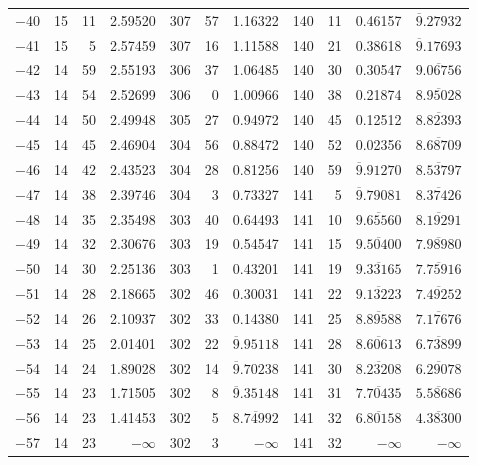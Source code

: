 \documentclass[12pt,a4paper]{article}
\begin{document}
\begin{small}
\begin{longtable}{@{}r|rr|rr|rr|rr|rr@{}}
$-$40 & 15 & 11 & 2.59520 & 307 & 57 & 1.16322 & 140 & 11 & 0.46157 & $\overline{9}.27932$ \\
$-$41 & 15 & 5 & 2.57459 & 307 & 16 & 1.11588 & 140 & 21 & 0.38618 & $\overline{9}.17693$ \\
$-$42 & 14 & 59 & 2.55193 & 306 & 37 & 1.06485 & 140 & 30 & 0.30547 & $\overline{9.06756}$ \\
$-$43 & 14 & 54 & 2.52699 & 306 & 0 & 1.00966 & 140 & 38 & 0.21874 & $\overline{8.95028}$ \\
$-$44 & 14 & 50 & 2.49948 & 305 & 27 & 0.94972 & 140 & 45 & 0.12512 & $\overline{8.82393}$ \\
$-$45 & 14 & 45 & 2.46904 & 304 & 56 & 0.88472 & 140 & 52 & 0.02356 & $\overline{8.68709}$ \\
$-$46 & 14 & 42 & 2.43523 & 304 & 28 & 0.81256 & 140 & 59 & $\overline{9}.91270$ & $\overline{8.53797}$ \\
$-$47 & 14 & 38 & 2.39746 & 304 & 3 & 0.73327 & 141 & 5 & $\overline{9}.79081$ & $\overline{8.37426}$ \\
$-$48 & 14 & 35 & 2.35498 & 303 & 40 & 0.64493 & 141 & 10 & $\overline{9.65560}$ & $\overline{8.19291}$ \\
$-$49 & 14 & 32 & 2.30676 & 303 & 19 & 0.54547 & 141 & 15 & $\overline{9.50400}$ & $\overline{7.98980}$ \\
$-$50 & 14 & 30 & 2.25136 & 303 & 1 & 0.43201 & 141 & 19 & $\overline{9.33165}$ & $\overline{7.75916}$ \\
$-$51 & 14 & 28 & 2.18665 & 302 & 46 & 0.30031 & 141 & 22 & $\overline{9.13223}$ & $\overline{7.49252}$ \\
$-$52 & 14 & 26 & 2.10937 & 302 & 33 & 0.14380 & 141 & 25 & $\overline{8.89588}$ & $\overline{7.17676}$ \\
$-$53 & 14 & 25 & 2.01401 & 302 & 22 & $\overline{9}.95118$ & 141 & 28 & $\overline{8.60613}$ & $\overline{6.73899}$ \\
$-$54 & 14 & 24 & 1.89028 & 302 & 14 & $\overline{9}.70238$ & 141 & 30 & $\overline{8.23208}$ & $\overline{6.29078}$ \\
$-$55 & 14 & 23 & 1.71505 & 302 & 8 & $\overline{9}.35148$ & 141 & 31 & $\overline{7.70435}$ & $\overline{5.58686}$ \\
$-$56 & 14 & 23 & 1.41453 & 302 & 5 & $\overline{8.74992}$ & 141 & 32 & $\overline{6.80158}$ & $\overline{4.38300}$ \\
$-$57 & 14 & 23 & $-\infty$ & 302 & 3 & $-\infty$ & 141 & 32 & $-\infty$ & $-\infty$ \\
\end{longtable}
\end{small}
\end{document}
